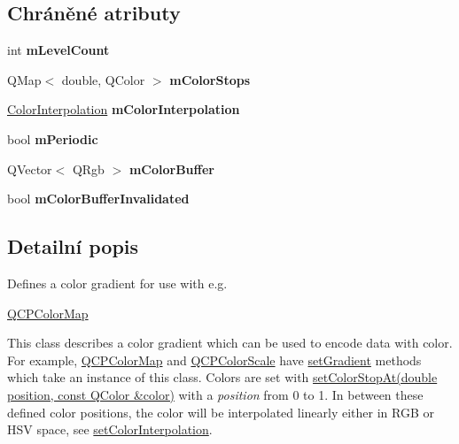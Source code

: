 \subsection*{Chráněné atributy}
\begin{DoxyCompactItemize}
\item 
\hypertarget{classQCPColorGradient_a98fb68e359904b2c991fcae3e38a211a}{}int {\bfseries m\+Level\+Count}\label{classQCPColorGradient_a98fb68e359904b2c991fcae3e38a211a}

\item 
\hypertarget{classQCPColorGradient_a9e11a2b0974ef289d12c324822bc3a3e}{}Q\+Map$<$ double, Q\+Color $>$ {\bfseries m\+Color\+Stops}\label{classQCPColorGradient_a9e11a2b0974ef289d12c324822bc3a3e}

\item 
\hypertarget{classQCPColorGradient_a028cef73d863800a9ee93ffd641cce01}{}\hyperlink{classQCPColorGradient_ac5dca17cc24336e6ca176610e7f77fc1}{Color\+Interpolation} {\bfseries m\+Color\+Interpolation}\label{classQCPColorGradient_a028cef73d863800a9ee93ffd641cce01}

\item 
\hypertarget{classQCPColorGradient_a4b07deeb20ca1ee2d5ea7e01bf0420af}{}bool {\bfseries m\+Periodic}\label{classQCPColorGradient_a4b07deeb20ca1ee2d5ea7e01bf0420af}

\item 
\hypertarget{classQCPColorGradient_af8b5f0739faa5f8295154d47ce38ecff}{}Q\+Vector$<$ Q\+Rgb $>$ {\bfseries m\+Color\+Buffer}\label{classQCPColorGradient_af8b5f0739faa5f8295154d47ce38ecff}

\item 
\hypertarget{classQCPColorGradient_abacf55e11f67d6722a687af1bb2687bd}{}bool {\bfseries m\+Color\+Buffer\+Invalidated}\label{classQCPColorGradient_abacf55e11f67d6722a687af1bb2687bd}

\end{DoxyCompactItemize}


\subsection{Detailní popis}
Defines a color gradient for use with e.\+g. 

\hyperlink{classQCPColorMap}{Q\+C\+P\+Color\+Map}

This class describes a color gradient which can be used to encode data with color. For example, \hyperlink{classQCPColorMap}{Q\+C\+P\+Color\+Map} and \hyperlink{classQCPColorScale}{Q\+C\+P\+Color\+Scale} have \hyperlink{classQCPColorMap_a7313c78360471cead3576341a2c50377}{set\+Gradient} methods which take an instance of this class. Colors are set with \hyperlink{classQCPColorGradient_a3b48be5e78079db1bb2a1188a4c3390e}{set\+Color\+Stop\+At(double position, const Q\+Color \&color)} with a {\itshape position} from 0 to 1. In between these defined color positions, the color will be interpolated linearly either in R\+G\+B or H\+S\+V space, see \hyperlink{classQCPColorGradient_aa13fda86406e1d896a465a409ae63b38}{set\+Color\+Interpolation}.

